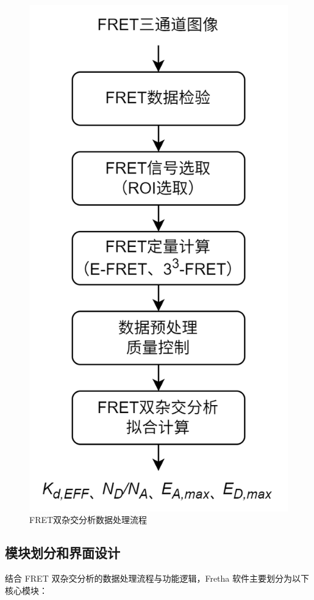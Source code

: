\begin{figure}[hbtp]
    \centering
    \includegraphics[width=0.4\linewidth]{../figures/2/2_FRET双杂交分析数据处理流程.png}
    \caption{FRET双杂交分析数据处理流程}
    \label{fig:tha_data_process}
\end{figure}

\fi

\subsection{模块划分和界面设计}

结合 FRET 双杂交分析的数据处理流程与功能逻辑，Fretha 软件主要划分为以下核心模块：

